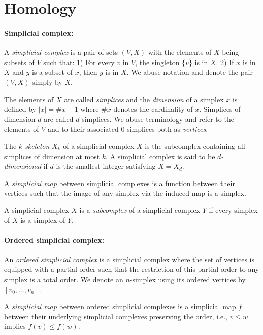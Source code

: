 \documentclass{article}
\begin{document}
	\section{Homology}
	
	\paragraph{Simplicial complex:} 
	
	A \textit{simplicial complex} is a pair of sets $(V, X)$ with the elements of $X$ being subsets of $V$ such that: 1) For every $v$ in $V$, the singleton $\{v\}$ is in $X$. 2) If $x$ is in $X$ and $y$ is a subset of $x$, then $y$ is in $X$. We abuse notation and denote the pair $(V,X)$ simply by $X$.
	
	The elements of $X$ are called \textit{simplices} and the \textit{dimension} of a simplex $x$ is defined by $|x| = \# x - 1$ where $\# x$ denotes the cardinality of $x$. Simplices of dimension $d$ are called $d$-simplices. We abuse terminology and refer to the elements of $V$ and to their associated $0$-simplices both as \textit{vertices}.
	
	The \textit{$k$-skeleton }$X_k$ of a simplicial complex $X$ is the subcomplex containing all simplices of dimension at most $k$. A simplicial complex is said to be \textit{$d$-dimensional} if $d$ is the smallest integer satisfying $X = X_d$.
	
	A \textit{simplicial map} between simplicial complexes is a function between their vertices such that the image of any simplex via the induced map is a simplex.
	
	A simplicial complex $X$ is a \textit{subcomplex} of a simplicial complex $Y$ if every simplex of $X$ is a simplex of $Y$.
	
	\paragraph{Ordered simplicial complex:} 
	
	An \textit{ordered simplicial complex} is a \underline{simplicial complex} where the set of vertices is equipped with a partial order such that the restriction of this partial order to any simplex is a total order. We denote an $n$-simplex using its ordered vertices by $[v_0, \dots, v_n]$.
	
	A \textit{simplicial map} between ordered simplicial complexes is a simplicial map $f$ between their underlying simplicial complexes preserving the order, i.e., $v \leq w$ implies $f(v) \leq f(w)$.
	
\end{document}
